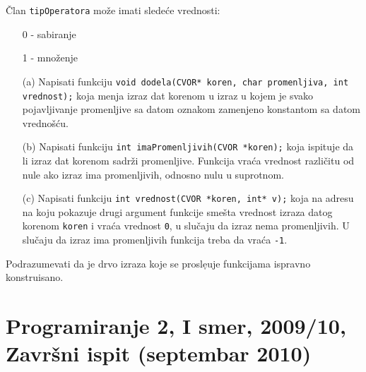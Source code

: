 \begin{enumerate}
\v{C}lan \verb|tipOperatora| mo\v{z}e imati slede\'ce vrednosti:
\begin{itemize}
\item[0] - sabiranje
\item[1] - mno\v{z}enje
\end{itemize}

\begin{itemize}
\item[(a)] Napisati funkciju \verb|void dodela(CVOR* koren, char promenljiva, int vrednost);|
koja menja izraz dat korenom u izraz u kojem je svako pojavljivanje promenljive sa datom
oznakom zamenjeno konstantom sa datom vredno\v{s}\'cu.

\item[(b)] Napisati funkciju \verb|int imaPromenljivih(CVOR *koren);|
koja ispituje da li izraz dat korenom sadr\v{z}i promenljive. Funkcija vra\'ca
vrednost razli\v{c}itu od nule ako izraz ima promenljivih, odnosno nulu
u suprotnom.

\item[(c)] Napisati funkciju \verb|int vrednost(CVOR *koren, int* v);|
koja na adresu na koju pokazuje drugi argument funkcije sme\v sta  vrednost izraza datog korenom \verb|koren| i vra\'ca vrednost \verb|0|,
u slu\v{c}aju da izraz nema promenljivih. U slu\v{c}aju da izraz ima
promenljivih funkcija treba da vra\'ca \verb|-1|.
\end{itemize}

Podrazumevati da je drvo izraza koje se prosle{\d}uje funkcijama ispravno konstruisano.
\end{enumerate}


\section{Programiranje 2, I smer, 2009/10, Zavr\v sni ispit (septembar 2010)}




